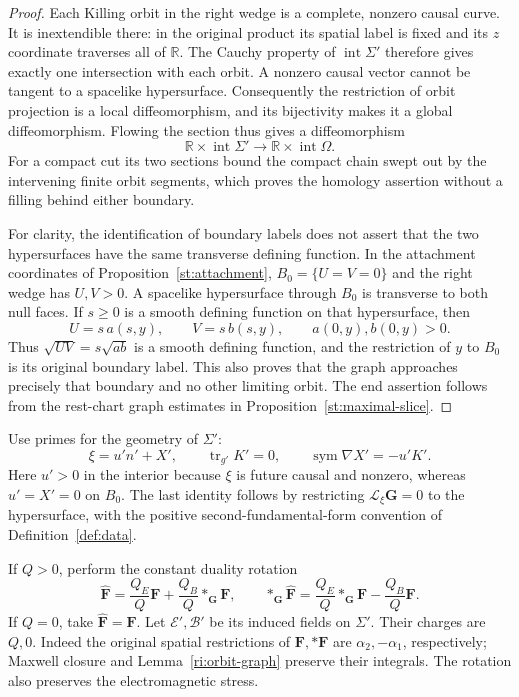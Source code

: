 \begin{proof}
Each Killing orbit in the right wedge is a complete, nonzero causal
curve.  It is inextendible there: in the original product its spatial
label is fixed and its $z$ coordinate traverses all of $\mathbb R$.
The Cauchy property of $\operatorname{int}\Sigma'$ therefore gives
exactly one intersection with each orbit.  A nonzero causal vector
cannot be tangent to a spacelike hypersurface.  Consequently the
restriction of orbit projection is a local diffeomorphism, and its
bijectivity makes it a global diffeomorphism.  Flowing the section
thus gives a diffeomorphism
\[
 \mathbb R\times\operatorname{int}\Sigma'
       \longrightarrow \mathbb R\times\operatorname{int}\Omega.
\]
For a compact cut its two sections bound the compact chain swept out
by the intervening finite orbit segments, which proves the homology
assertion without a filling behind either boundary.

For clarity, the identification of boundary labels does not assert
that the two hypersurfaces have the same transverse defining
function.  In the attachment coordinates of
Proposition~\ref{st:attachment}, $B_0=\{U=V=0\}$ and the right wedge
has $U,V>0$.  A spacelike hypersurface through $B_0$ is transverse to
both null faces.  If $s\geq0$ is a smooth defining function on that
hypersurface, then
\[
 U=s\,a(s,y),\qquad V=s\,b(s,y),\qquad a(0,y),b(0,y)>0.
\]
Thus $\sqrt{UV}=s\sqrt{ab}$ is a smooth defining function, and the
restriction of $y$ to $B_0$ is its original boundary label.  This also
proves that the graph approaches precisely that boundary and no
other limiting orbit.  The end assertion follows from the rest-chart
graph estimates in Proposition~\ref{st:maximal-slice}.
\end{proof}

Use primes for the geometry of $\Sigma'$:
\[
 \xi=u'n'+X',\qquad \operatorname{tr}_{g'}K'=0,\qquad
 \operatorname{sym}\nabla X'=-u'K'.
\]
Here $u'>0$ in the interior because $\xi$ is future causal and nonzero,
whereas $u'=X'=0$ on $B_0$.  The last identity follows by restricting
$\mathcal L_\xi\mathbf G=0$ to the hypersurface, with the positive
second-fundamental-form convention of Definition~\ref{def:data}.

If $Q>0$, perform the constant duality rotation
\begin{equation}
\label{ri:duality}
 \widehat{\mathbf F}
   =\frac{Q_E}{Q}\mathbf F+\frac{Q_B}{Q}*_{\mathbf G}\mathbf F,
 \qquad
 *_{\mathbf G}\widehat{\mathbf F}
   =\frac{Q_E}{Q}*_{\mathbf G}\mathbf F
       -\frac{Q_B}{Q}\mathbf F.
\end{equation}
If $Q=0$, take $\widehat{\mathbf F}=\mathbf F$.
Let $\mathcal E',\mathcal B'$ be its induced fields on $\Sigma'$.
Their charges are $Q,0$.  Indeed the original spatial restrictions
of $\mathbf F,*\mathbf F$ are $\alpha_2,-\alpha_1$, respectively;
Maxwell closure and Lemma~\ref{ri:orbit-graph} preserve their
integrals.  The rotation also preserves the electromagnetic stress.

